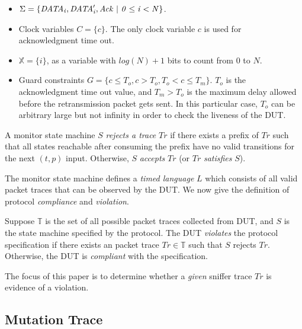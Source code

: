 \begin{itemize}
  \item $\Sigma = \{\it{DATA}_i, \it{DATA}'_i, Ack\ |\ 0 \le i < N\}$.
  \item Clock variables $C = \{c\}$. The only clock variable $c$ is
    used for acknowledgment time out.
  \item $\mathbb{X} = \{i\}$, as a variable with ${\mathit log}(N) + 1$ bits to
    count from $0$ to $N$.  
  \item Guard constraints $G = \{ c \le T_o, c > T_o, T_o < c \le T_m\}$.
    $T_o$ is the acknowledgment time out value, and $T_m >
    T_o$ is the maximum delay allowed before the retransmission packet gets
    sent. In this particular case, $T_o$ can be arbitrary large but not infinity
        in order to check the liveness of the DUT.
\end{itemize}


\begin{definition}
    A monitor state machine $S$ {\it rejects a trace} $Tr$ if there
    exists a prefix of $Tr$ such that all states reachable after consuming the
    prefix have no valid transitions for the next $(t, p)$ input. Otherwise, $S$
    {\it accepts} $Tr$ (or $Tr$ {\it satisfies} $S$).
\end{definition}


The monitor state machine defines a \textit{timed language} $L$ which consists
of all valid packet traces that can be observed by the DUT.  We now give the
definition of protocol \textit{compliance} and \textit{violation}.

\begin{definition}
  Suppose $\mathbb{T}$ is the set of all possible packet traces collected from
  DUT, and $S$ is the state machine specified by the protocol. The DUT
  \textit{violates} the protocol specification if there exists an
  packet trace $Tr \in \mathbb{T}$ such that $S$ rejects $Tr$.
  Otherwise, the DUT is \textit{compliant} with the specification.
\end{definition}

The focus of this paper is to determine whether a \textit{given} sniffer trace
$Tr$ is evidence of a violation.
%


\subsection{Mutation Trace}
\label{subsec:mutation}

